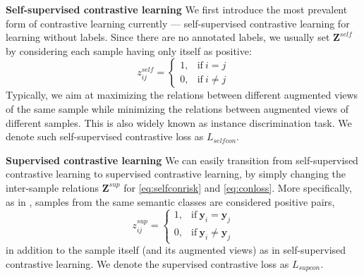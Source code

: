 \documentclass[10pt,twocolumn,letterpaper]{article}
\def\vy{{\bm{y}}}
\def\mZ{{\bm{Z}}}
\begin{document}
\noindent\textbf{Self-supervised contrastive learning}
\label{method_pre_selfcontratsive}
We first introduce the most prevalent form of contrastive learning currently --- self-supervised contrastive learning for learning without labels. Since there are no annotated labels, we usually set $\mZ^{self}$ by considering each sample having only itself as positive:
\begin{equation}
    z^{self}_{ij}=\left\{
                \begin{array}{ll}
                  1, &\text{if}\ i = j\\
                   0, &\text{if}\ i \neq j
                \end{array}
              \right.
\end{equation}
Typically, we aim at maximizing the relations between different augmented views of the same sample while minimizing the relations between augmented views of different samples. This is also widely known as instance discrimination task. We denote such self-supervised contrastive loss as $L_{selfcon}$.

\noindent\textbf{Supervised contrastive learning}
\label{method_pre_supervisedcontrastivelearning}
We can easily transition from self-supervised contrastive learning to supervised contrastive learning, by simply changing the inter-sample relations $\mZ^{sup}$ for \cref{eq:selfconrisk} and \cref{eq:conloss}. More specifically, as in \cite{nca, cns, supcon}, samples from the same semantic classes are considered positive pairs, 
\begin{equation}
    z^{sup}_{ij}=\left\{
                \begin{array}{ll}
                  1, &\text{if}\ \vy_i = \vy_j\\
                   0, &\text{if}\ \vy_i \neq \vy_j
                \end{array}
              \right.
\end{equation}
in addition to the sample itself (and its augmented views) as in self-supervised contrastive learning. We denote the supervised contrastive loss as $L_{supcon}$.
\end{document}

